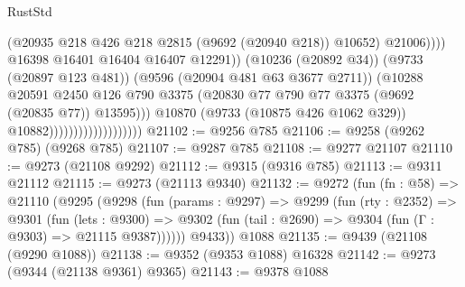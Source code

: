 \begin{lexlean}{RustStd}
\begin{coremodule}
                                                        (@20935
                                                          @218
                                                          @426
                                                          @218
                                                          @2815
                                                          (@9692 (@20940 @218))
                                                          @10652)
                                                        @21006))))
                                                @16398
                                                @16401
                                                @16404
                                                @16407
                                                @12291))
                                            (@10236 (@20892 @34))
                                            (@9733 (@20897 @123 @481))
                                            (@9596 (@20904 @481 @63 @3677 @2711))
                                            (@10288
                                              @20591
                                              @2450
                                              @126
                                              @790
                                              @3375
                                              (@20830
                                                @77
                                                @790
                                                @77
                                                @3375
                                                (@9692 (@20835 @77))
                                                @13595)))
                                          @10870
                                          (@9733 (@10875 @426 @1062 @329))
                                          @10882)))))))))))))))))))
@21102 := @9256 @785
@21106 := @9258 (@9262 @785) (@9268 @785)
@21107 := @9287 @785
@21108 := @9277 @21107
@21110 := @9273 (@21108 @9292)
@21112 := @9315 (@9316 @785)
@21113 := @9311 @21112
@21115 := @9273 (@21113 @9340)
@21132 := @9272
    (fun (fn : @58) =>
    @21110
      (@9295
        (@9298
          (fun (params : @9297) =>
          @9299
            (fun (rty : @2352) =>
            @9301
              (fun (lets : @9300) =>
              @9302 (fun (tail : @2690) => @9304 (fun (Γ : @9303) => @21115 @9387))))))
        @9433))
    @1088
@21135 := @9439 (@21108 (@9290 @1088))
@21138 := @9352 (@9353 @1088) @16328
@21142 := @9273 (@9344 (@21138 @9361) @9365)
@21143 := @9378 @1088

\end{coremodule}
\end{lexlean}
